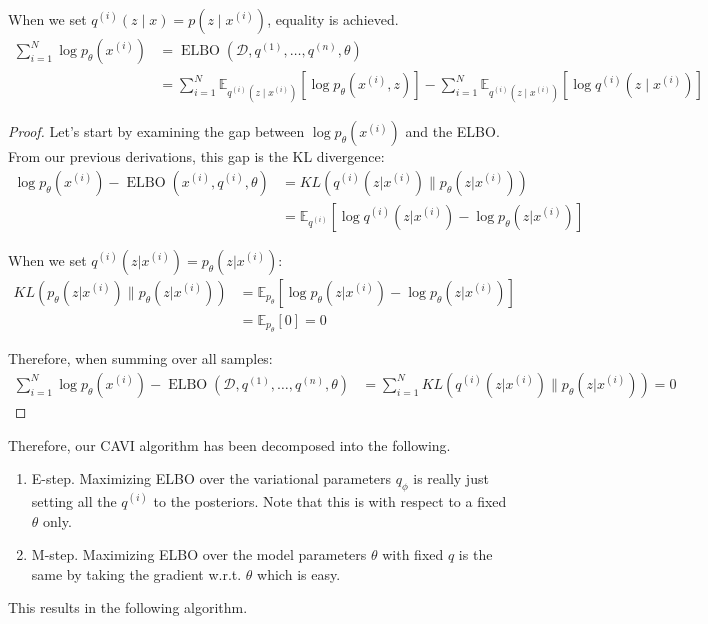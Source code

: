 \documentclass{article}
\DeclareMathOperator{\elbo}{ELBO}
\begin{document}
  \begin{theorem} 
    When we set $q^(i) (z \mid x) = p(z \mid x^{(i)})$, equality is achieved. 
    \begin{align}
      \sum_{i=1}^N \log p_{\theta} (x^{(i)}) & = \elbo(\mathcal{D}, q^{(1)}, \ldots, q^{(n)}, \theta) \\ 
                                             & = \sum_{i=1}^N \mathbb{E}_{q^{(i)} (z \mid x^{(i)})} [ \log p_{\theta} (x^{(i)}, z)] - \sum_{i=1}^N \mathbb{E}_{q^{(i)} (z \mid x^{(i)})} [ \log q^{(i)} (z \mid x^{(i)}) ]
    \end{align}
  \end{theorem}
  \begin{proof}
    Let's start by examining the gap between $\log p_\theta(x^{(i)})$ and the ELBO. From our previous derivations, this gap is the KL divergence:
    \begin{align}
      \log p_\theta(x^{(i)}) - \elbo(x^{(i)}, q^{(i)}, \theta) &= KL(q^{(i)}(z|x^{(i)}) \| p_\theta(z|x^{(i)})) \\
      &= \mathbb{E}_{q^{(i)}}[\log q^{(i)}(z|x^{(i)}) - \log p_\theta(z|x^{(i)})]
    \end{align}

    When we set $q^{(i)}(z|x^{(i)}) = p_\theta(z|x^{(i)})$:
    \begin{align}
      KL(p_\theta(z|x^{(i)}) \| p_\theta(z|x^{(i)})) &= \mathbb{E}_{p_\theta}[\log p_\theta(z|x^{(i)}) - \log p_\theta(z|x^{(i)})] \\
      &= \mathbb{E}_{p_\theta}[0] = 0
    \end{align}

    Therefore, when summing over all samples:
    \begin{align}
      \sum_{i=1}^N \log p_\theta(x^{(i)}) - \elbo(\mathcal{D}, q^{(1)}, \ldots, q^{(n)}, \theta) &= \sum_{i=1}^N KL(q^{(i)}(z|x^{(i)}) \| p_\theta(z|x^{(i)})) = 0
    \end{align}
  \end{proof} 

  Therefore, our CAVI algorithm has been decomposed into the following. 
  \begin{enumerate}
    \item E-step. Maximizing ELBO over the variational parameters $q_\phi$ is really just setting all the $q^{(i)}$ to the posteriors. Note that this is with respect to a fixed $\theta$ only. 
    \item M-step. Maximizing ELBO over the model parameters $\theta$ with fixed $q$ is the same by taking the gradient w.r.t. $\theta$ which is easy. 
  \end{enumerate}
  This results in the following algorithm. 
\end{document}
